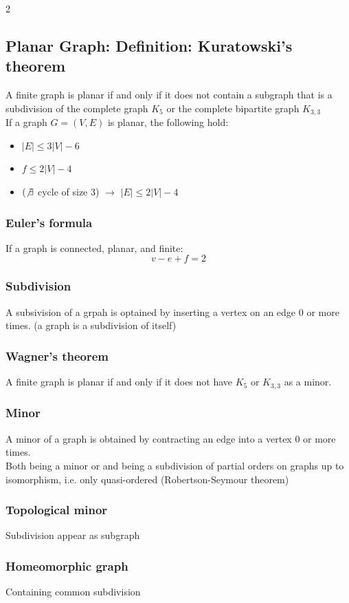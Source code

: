 \documentclass[8pt]{extarticle}
\theoremstyle{definition}
\begin{document}
\begin{multicols*}{2}
\subsection{Planar Graph: Definition: Kuratowski's theorem}
A finite graph is planar if and only if it does not contain a subgraph that is a subdivision of the complete graph $K_5$ or the complete bipartite graph $K_{3, 3}$\\
If a graph $G = (V, E)$ is planar, the following hold:
\begin{itemize}
  \item $|E| \leq 3|V| - 6$
  \item $f \leq 2 |V| - 4$
  \item $(\not\exists$ cycle of size 3) $\rightarrow$ $|E| \leq 2|V| -4 $
\end{itemize}
\subsubsection*{Euler's formula}
If a graph is connected, planar, and finite:
\[v - e + f = 2\]
\subsubsection*{Subdivision}
A subsivision of a grpah is optained by inserting a vertex on an edge 0 or more times. (a graph is a subdivision of itself)
\subsubsection*{Wagner's theorem}
A finite graph is planar if and only if it does not have $K_5$ or $K_{3,3}$ as a minor.
\subsubsection*{Minor}
A minor of a graph is obtained by contracting an edge into a vertex 0 or more times.\\
Both being a minor or and being a subdivision of partial orders on graphs up to isomorphism, i.e. only quasi-ordered (Robertson-Seymour theorem)
\subsubsection*{Topological minor}
Subdivision appear as subgraph
\subsubsection*{Homeomorphic graph}
Containing common subdivision


\end{multicols*}
\end{document}
